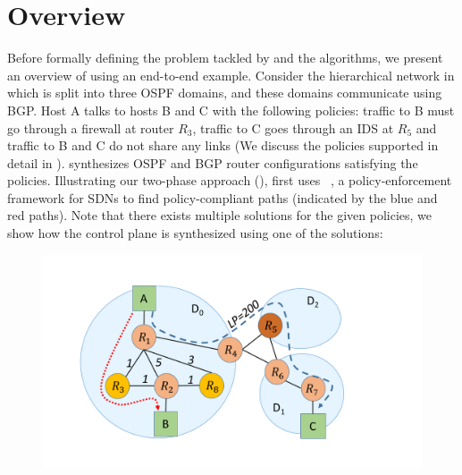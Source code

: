 \section{Overview}
Before formally defining the problem tackled by \name and the algorithms, 
we present an overview of \name using an end-to-end
example. Consider the hierarchical network in  which
is split into three OSPF domains, and these domains communicate
using BGP. Host A talks to hosts B and C with the following policies:
traffic to B must go through a firewall at router $R_3$, traffic to C 
goes through an IDS at $R_5$ and traffic 
to B and C do not share any links (We discuss the policies supported in
detail in ). \name 
synthesizes OSPF and BGP router configurations satisfying the 
policies. Illustrating our two-phase approach (), 
\name first uses \genesis~\cite{genesis}, a policy-enforcement framework for SDNs 
to find policy-compliant paths (indicated by the blue and
red paths). Note that there exists multiple solutions for the given
policies, we show how the control plane is synthesized using one of the solutions:
\begin{figure}
	\includegraphics[width=0.75\columnwidth]{figures/example.pdf}
	\label{fig:example}
\end{figure}

